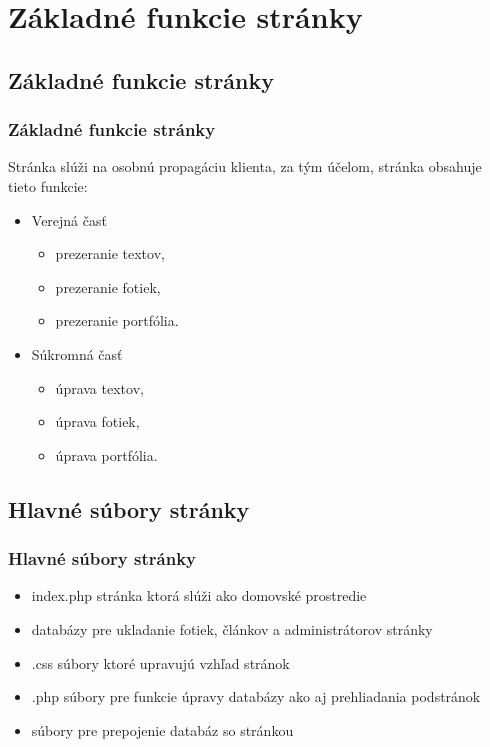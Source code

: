 
\label{Základné funkcie stránky}
\section{Základné funkcie stránky}
\subsection{Základné funkcie stránky}
\begin{frame}\frametitle{Základné funkcie stránky}

Stránka slúži na osobnú propagáciu klienta, za tým účelom, stránka obsahuje tieto funkcie:

  \begin{itemize}

        \item Verejná časť

           \begin{itemize}
                \item prezeranie textov,
                \item prezeranie fotiek,
                \item prezeranie portfólia.
            \end{itemize}
         \item Súkromná časť

         \begin{itemize}
            \item úprava textov,
             \item úprava fotiek,
             \item úprava portfólia.
       \end{itemize}
  \end{itemize}
\end{frame}

\subsection{Hlavné súbory stránky}
\begin{frame}\frametitle{Hlavné súbory stránky}

    \begin{itemize}

         \item index.php stránka ktorá slúži ako domovské prostredie
         \item databázy pre ukladanie fotiek, článkov a administrátorov stránky
         \item .css súbory ktoré upravujú vzhľad stránok
         \item .php súbory pre funkcie úpravy databázy ako aj prehliadania podstránok
         \item súbory pre prepojenie databáz so stránkou
  \end{itemize}
\end{frame}



